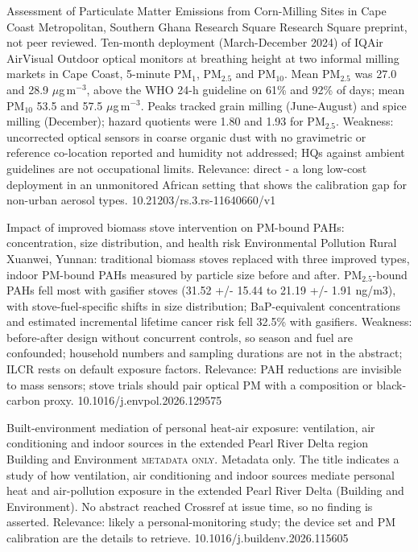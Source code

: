\documentclass[10pt]{article}
\begin{document}
\par{}\baselineskip{}\baselineskip
{}

{Assessment of Particulate Matter Emissions from Corn-Milling Sites in Cape Coast Metropolitan, Southern Ghana}
{Research Square}
{Research Square preprint, not peer reviewed. Ten-month deployment (March-December 2024) of IQAir AirVisual Outdoor optical monitors at breathing height at two informal milling markets in Cape Coast, 5-minute PM$_{1}$, PM$_{2.5}$ and PM$_{10}$. Mean PM$_{2.5}$ was 27.0 and 28.9 $\mu$g\,m$^{-3}$, above the WHO 24-h guideline on 61\% and 92\% of days; mean PM$_{10}$ 53.5 and 57.5 $\mu$g\,m$^{-3}$. Peaks tracked grain milling (June-August) and spice milling (December); hazard quotients were 1.80 and 1.93 for PM$_{2.5}$. Weakness: uncorrected optical sensors in coarse organic dust with no gravimetric or reference co-location reported and humidity not addressed; HQs against ambient guidelines are not occupational limits. Relevance: direct - a long low-cost deployment in an unmonitored African setting that shows the calibration gap for non-urban aerosol types.}
{10.21203/rs.3.rs-11640660/v1}

{Impact of improved biomass stove intervention on PM-bound PAHs: concentration, size distribution, and health risk}
{Environmental Pollution}
{Rural Xuanwei, Yunnan: traditional biomass stoves replaced with three improved types, indoor PM-bound PAHs measured by particle size before and after. PM$_{2.5}$-bound PAHs fell most with gasifier stoves (31.52 +/- 15.44 to 21.19 +/- 1.91 ng/m3), with stove-fuel-specific shifts in size distribution; BaP-equivalent concentrations and estimated incremental lifetime cancer risk fell 32.5\% with gasifiers. Weakness: before-after design without concurrent controls, so season and fuel are confounded; household numbers and sampling durations are not in the abstract; ILCR rests on default exposure factors. Relevance: PAH reductions are invisible to mass sensors; stove trials should pair optical PM with a composition or black-carbon proxy.}
{10.1016/j.envpol.2026.129575}

{Built-environment mediation of personal heat-air exposure: ventilation, air conditioning and indoor sources in the extended Pearl River Delta region}
{Building and Environment}
{\textsc{metadata only.} Metadata only. The title indicates a study of how ventilation, air conditioning and indoor sources mediate personal heat and air-pollution exposure in the extended Pearl River Delta (Building and Environment). No abstract reached Crossref at issue time, so no finding is asserted. Relevance: likely a personal-monitoring study; the device set and PM calibration are the details to retrieve.}
{10.1016/j.buildenv.2026.115605}
\end{document}
